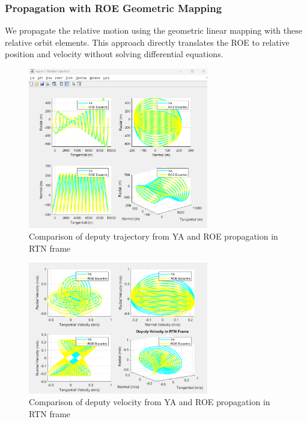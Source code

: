 \subsubsection{Propagation with ROE Geometric Mapping}
We propagate the relative motion using the geometric linear mapping with these relative orbit elements. This approach directly translates the ROE to relative position and velocity without solving differential equations.

\begin{figure}[H]
    \centering
    \includegraphics[width=0.7\textwidth]{PS3/Figures/ROE_YA_Position.png}
    \caption{Comparison of deputy trajectory from YA and ROE propagation in RTN frame}
    \label{fig:roe_ya_position}
\end{figure}

\begin{figure}[H]
    \centering
    \includegraphics[width=0.7\textwidth]{PS3/Figures/ROE_YA_Velocity.png}
    \caption{Comparison of deputy velocity from YA and ROE propagation in RTN frame}
    \label{fig:roe_ya_velocity}
\end{figure}

